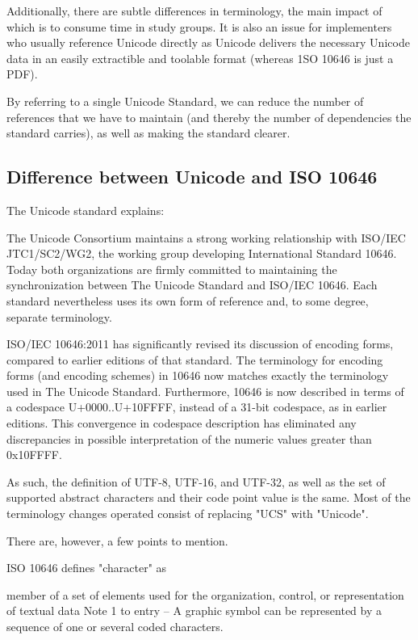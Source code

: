\documentclass{wg21}
\begin{document}
Additionally, there are subtle differences in terminology, the main impact of which
is to consume time in study groups.
It is also an issue for implementers who usually reference
Unicode directly as Unicode delivers the necessary Unicode data in an easily extractible
and toolable format (whereas 1SO 10646 is just a PDF).

By referring to a single Unicode Standard, we can reduce the number of references
that we have to maintain (and thereby the number of dependencies the standard carries),
as well as making the standard clearer.

\subsection{Difference between Unicode and ISO 10646}

The Unicode standard explains:

\begin{quoteblock}
The Unicode Consortium maintains a strong working relationship with ISO/IEC
JTC1/SC2/WG2, the working group developing International Standard 10646. Today both
organizations are firmly committed to maintaining the synchronization between The Unicode Standard and ISO/IEC 10646. Each standard nevertheless uses its own form of reference and, to some degree, separate terminology.
\end{quoteblock}

\begin{quoteblock}
ISO/IEC 10646:2011 has significantly revised its discussion of encoding forms, compared
to earlier editions of that standard. The terminology for encoding forms (and encoding
schemes) in 10646 now matches exactly the terminology used in The Unicode Standard.
Furthermore, 10646 is now described in terms of a codespace U+0000..U+10FFFF, instead
of a 31-bit codespace, as in earlier editions. This convergence in codespace description has
eliminated any discrepancies in possible interpretation of the numeric values greater than
0x10FFFF.
\end{quoteblock}

As such, the definition of UTF-8, UTF-16, and UTF-32, as well as the set of supported abstract characters and their code point value is the same.
Most of the terminology changes operated consist of replacing "UCS" with "Unicode".

There are, however, a few points to mention.

ISO 10646 defines "character" as
\begin{quoteblock}
member of a set of elements used for the organization, control, or representation of textual data
Note 1 to entry – A graphic symbol can be represented by a sequence of one or several coded characters.
\end{quoteblock}
\end{document}
